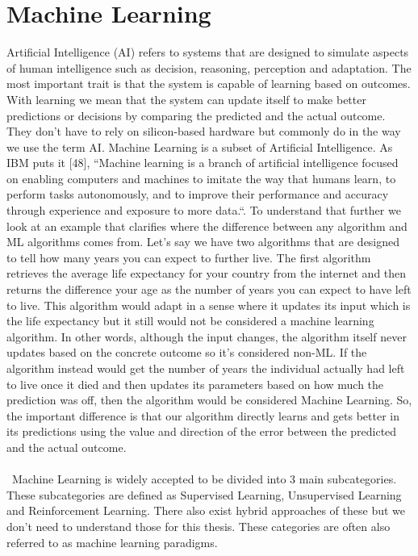 \documentclass[a4paper,12pt]{report}
\begin{document}
\chapter{Machine Learning}
Artificial Intelligence (AI) refers to systems that are designed to simulate aspects of human intelligence such as decision, reasoning, perception and adaptation. The most important trait is that the system is capable of learning based on outcomes. With learning we mean that the system can update itself to make better predictions or decisions by comparing the predicted and the actual outcome. They don’t have to rely on silicon-based hardware but commonly do in the way we use the term AI. Machine Learning is a subset of Artificial Intelligence. As IBM puts it [48], “Machine learning is a branch of artificial intelligence focused on enabling computers and machines to imitate the way that humans learn, to perform tasks autonomously, and to improve their performance and accuracy through experience and exposure to more data.“. To understand that further we look at an example that clarifies where the difference between any algorithm and ML algorithms comes from. Let’s say we have two algorithms that are designed to tell how many years you can expect to further live. The first algorithm retrieves the average life expectancy for your country from the internet and then returns the difference your age as the number of years you can expect to have left to live. This algorithm would adapt in a sense where it updates its input which is the life expectancy but it still would not be considered a machine learning algorithm. In other words, although the input changes, the algorithm itself never updates based on the concrete outcome so it's considered non-ML. If the algorithm instead would get the number of years the individual actually had left to live once it died and then updates its parameters based on how much the prediction was off, then the algorithm would be considered Machine Learning. So, the important difference is that our algorithm directly learns and gets better in its predictions using the value and direction of the error between the predicted and the actual outcome.\\
\\\	
Machine Learning is widely accepted to be divided into 3 main subcategories. These subcategories are defined as Supervised Learning, Unsupervised Learning and Reinforcement Learning. There also exist hybrid approaches of these but we don't need to understand those for this thesis. These categories are often also referred to as machine learning paradigms. 
\end{document}
